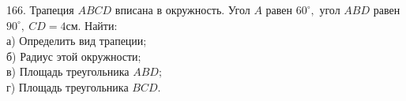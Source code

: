 166. Трапеция $ABCD$ вписана в окружность. Угол $A$ равен $60^\circ,$ угол $ABD$ равен $90^\circ,\ CD=4$см. Найти:\\
а) Определить вид трапеции;\\
б) Радиус этой окружности;\\
в) Площадь треугольника $ABD;$\\
г) Площадь треугольника $BCD.$\\
